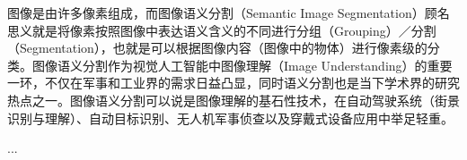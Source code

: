 图像是由许多像素组成，而图像语义分割（Semantic Image Segmentation）顾名思义就是将像素按照图像中表达语义含义的不同进行分组（Grouping）／分割（Segmentation），也就是可以根据图像内容（图像中的物体）进行像素级的分类。图像语义分割作为视觉人工智能中图像理解（Image Understanding）的重要一环，不仅在军事和工业界的需求日益凸显，同时语义分割也是当下学术界的研究热点之一。图像语义分割可以说是图像理解的基石性技术，在自动驾驶系统（街景识别与理解）、自动目标识别、无人机军事侦查以及穿戴式设备应用中举足轻重。

...


